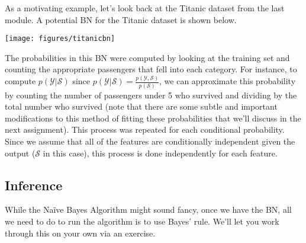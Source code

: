 \documentclass[assignment02_Solutions]{subfiles}
\begin{document}
As a motivating example, let's look back at the Titanic dataset from the last module.  A potential BN for the Titanic dataset is shown below.

\begin{center}
\texttt{[image: figures/titanicbn]}
\end{center}

The probabilities in this BN were computed by looking at the training set and counting the appropriate passengers that fell into each category.  For instance, to compute $p(\mathcal{Y}|\mathcal{S})$ since $p(\mathcal{Y}|\mathcal{S}) = \frac{p(\mathcal{Y}, \mathcal{S})}{p(\mathcal{S})}$, we can approximate this probability by counting the number of passengers under 5 who survived and dividing by the total number who survived (note that there are some subtle and important modifications to this method of fitting these probabilities that we'll discuss in the next assignment).  This process was repeated for each conditional probability.  Since we assume that all of the features are conditionally independent given the output ($\mathcal{S}$ in this case), this process is done independently for each feature.

\subsection{Inference}
While the Na\"ive Bayes Algorithm might sound fancy, once we have the BN, all we need to do to run the algorithm is to use Bayes' rule.  We'll let you work through this on your own via an exercise.
\end{document}
